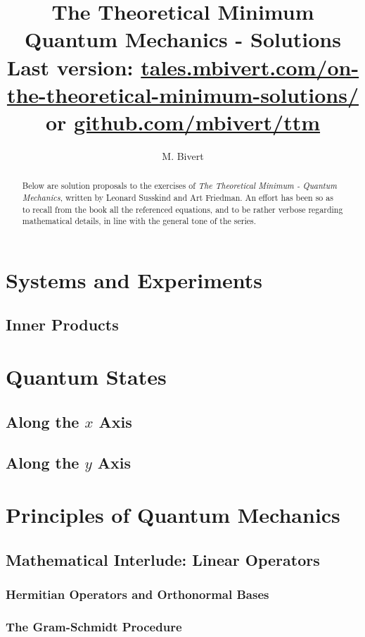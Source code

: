 \documentclass[a4paper]{article}
\author{M. Bivert}
\title{The Theoretical Minimum \\
	{\Large Quantum Mechanics - Solutions} \\
	{\footnotesize Last version: %
		\href{https://tales.mbivert.com/on-the-theoretical-minimum-solutions/}%
		{tales.mbivert.com/on-the-theoretical-minimum-solutions/} or %
		\href{https://github.com/mbivert/ttm}{github.com/mbivert/ttm}}
}
\begin{document}
\maketitle
\begin{abstract}
Below are solution proposals to the exercises of
\textit{The Theoretical Minimum - Quantum Mechanics}, written
by Leonard Susskind and Art Friedman. An effort has been
so as to recall from the book all the referenced equations,
and to be rather verbose regarding mathematical details,
in line with the general tone of the series.
\end{abstract}

\tableofcontents

\section{Systems and Experiments}
\subsection{Inner Products}


\section{Quantum States}
\subsection{Along the $x$ Axis}

\subsection{Along the $y$ Axis}


\section{Principles of Quantum Mechanics}
\subsection{Mathematical Interlude: Linear Operators}
\subsubsection{Hermitian Operators and Orthonormal Bases}

\subsubsection{The Gram-Schmidt Procedure}
\end{document}
